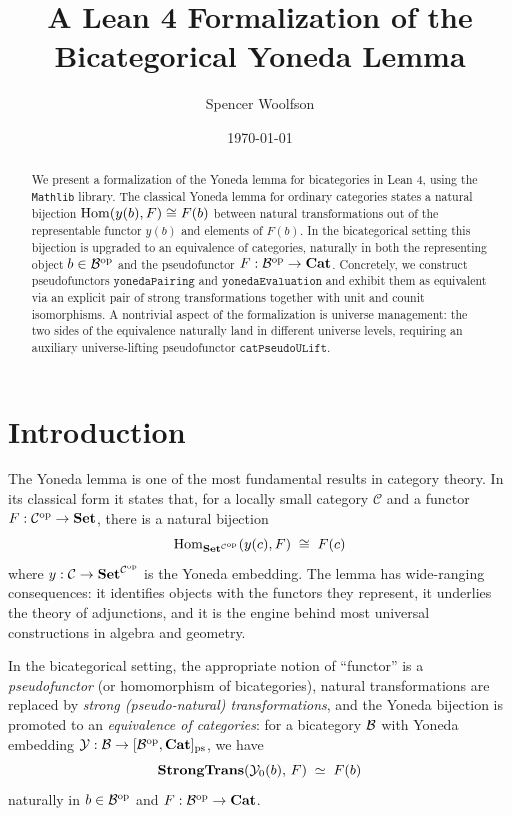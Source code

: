 \documentclass[12pt]{article}
\title{A Lean 4 Formalization of the Bicategorical Yoneda Lemma}
\author{Spencer Woolfson}
\date{\today}
\begin{document}
\maketitle

\begin{abstract}
  We present a formalization of the Yoneda lemma for bicategories in Lean 4, using
  the \texttt{Mathlib} library.  The classical Yoneda lemma for ordinary categories
  states a natural bijection $\mathrm{Hom}(y(b), F) \cong F(b)$ between natural transformations
  out of the representable functor $y(b)$ and elements of $F(b)$.  In the bicategorical
  setting this bijection is upgraded to an equivalence of categories, naturally in both
  the representing object $b \in \mathcal{B}^{\mathrm{op}}$ and the pseudofunctor
  $F : \mathcal{B}^{\mathrm{op}} \to \mathbf{Cat}$.  Concretely, we construct pseudofunctors
  $\mathtt{yonedaPairing}$ and $\mathtt{yonedaEvaluation}$ and exhibit them as
  equivalent via an explicit pair of strong transformations together with unit and
  counit isomorphisms.  A nontrivial aspect of the formalization is universe management:
  the two sides of the equivalence naturally land in different universe levels, requiring
  an auxiliary universe-lifting pseudofunctor $\mathtt{catPseudoULift}$.
\end{abstract}

\tableofcontents
\newpage

\section{Introduction}

The Yoneda lemma is one of the most fundamental results in category theory.  In its
classical form it states that, for a locally small category $\mathcal{C}$ and a functor
$F : \mathcal{C}^{\mathrm{op}} \to \mathbf{Set}$, there is a natural bijection
\[
  \mathrm{Hom}_{\mathbf{Set}^{\mathcal{C}^{\mathrm{op}}}}(y(c), F) \;\cong\; F(c)
\]
where $y : \mathcal{C} \to \mathbf{Set}^{\mathcal{C}^{\mathrm{op}}}$ is the Yoneda embedding.
The lemma has wide-ranging consequences: it identifies objects with the functors they
represent, it underlies the theory of adjunctions, and it is the engine behind most
universal constructions in algebra and geometry.

In the bicategorical setting, the appropriate notion of ``functor'' is a
\emph{pseudofunctor} (or homomorphism of bicategories), natural transformations are
replaced by \emph{strong (pseudo-natural) transformations}, and the Yoneda bijection is
promoted to an \emph{equivalence of categories}: for a bicategory $\mathcal{B}$ with Yoneda
embedding $\mathcal{Y} : \mathcal{B} \to [\mathcal{B}^{\mathrm{op}}, \mathbf{Cat}]_{\mathrm{ps}}$, we have
\begin{equation}\label{eq:bi-yoneda}
  \mathbf{StrongTrans}(\mathcal{Y}_0(b),\, F) \;\simeq\; F(b)
\end{equation}
naturally in $b \in \mathcal{B}^{\mathrm{op}}$ and $F : \mathcal{B}^{\mathrm{op}} \to \mathbf{Cat}$.
\end{document}
